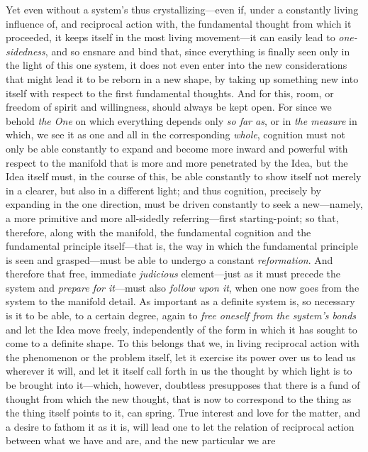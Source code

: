 \documentclass[12pt,a4paper]{book}
\begin{document}
Yet even without a system's thus crystallizing---even if, under a constantly living
influence of, and reciprocal action with, the fundamental thought from which it
proceeded, it keeps itself in the most living movement---it can easily lead to
\emph{one-sidedness}, and so ensnare and bind that, since everything is finally seen only
in the light of this one system, it does not even enter into the new considerations that
might lead it to be reborn in a new shape, by taking up something new into itself with
respect to the first fundamental thoughts. And for this, room, or freedom of spirit and
willingness, should always be kept open. For since we behold \emph{the One} on which
everything depends only \emph{so far as}, or in \emph{the measure} in which, we see it as one and
all in the corresponding \emph{whole}, cognition must not only be able constantly to expand and
become more inward and powerful with respect to the manifold that is more and more
penetrated by the Idea, but the Idea itself must, in the course of this, be able
constantly to show itself not merely in a clearer, but also in a different light; and thus
cognition, precisely by expanding in the one direction, must be driven constantly to seek
a new---namely, a more primitive and more all-sidedly referring---first
starting-point; so that, therefore, along with the manifold, the fundamental cognition
and the fundamental principle itself---that is, the way in which the fundamental principle
is seen and grasped---must be able to undergo a constant \emph{reformation}. And therefore
that free, immediate \emph{judicious} element---just as it must precede the system and
\emph{prepare for it}---must also \emph{follow upon it}, when one now goes from the system to the
manifold detail. As important as a definite system is, so necessary is it to be able, to a
certain degree, again to \emph{free oneself from the system's bonds} and let the Idea move
freely, independently of the form in which it has sought to come to a definite shape. To
this belongs that we, in living reciprocal action with the phenomenon or the problem
itself, let it exercise its power over us to lead us wherever it will, and let it itself
call forth in us the thought by which light is to be brought into it---which, however,
doubtless presupposes that there is a fund of thought from which the new thought, that is
now to correspond to the thing as the thing itself points to it, can spring. True interest
and love for the matter, and a desire to fathom it as it is, will lead one to let the
relation of reciprocal action between what we have and are, and the new particular we are
\end{document}
